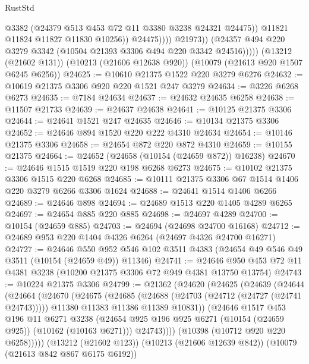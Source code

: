 \begin{lexlean}{RustStd}
\begin{coremodule}
                            @3382
                            (@24379 @513 @453 @72 @11 @3380 @3238 @24321 @24475))
                          @11821
                          @11824
                          @11827
                          @11830
                          @10256))
                      @24475))))
              @21973))
          (@24357 @494 @220 @3279 @3342 (@10504 @21393 @3306 @494 @220 @3342 @24516)))))
    (@13212 (@21602 @131))
    (@10213 (@21606 @12638 @920))
    (@10079 (@21613 @920 @1507 @6245 @6256))
@24625 := @10610 @21375 @1522 @220 @3279 @6276
@24632 := @10619 @21375 @3306 @920 @220 @1521 @247 @3279
@24634 := @3226 @6268 @6273
@24635 := @7184 @24634
@24637 := @24632 @24635 @6258
@24638 := @11507 @21733
@24639 := @24637 @24638
@24641 := @10125 @21375 @3306
@24644 := @24641 @1521 @247 @24635
@24646 := @10134 @21375 @3306
@24652 := @24646 @894 @1520 @220 @222 @4310 @24634
@24654 := @10146 @21375 @3306
@24658 := @24654 @872 @220 @872 @4310
@24659 := @10155 @21375
@24664 := @24652 (@24658 (@10154 (@24659 @872)) @16238)
@24670 := @24646 @1515 @1519 @220 @198 @6268 @6273
@24675 := @10102 @21375 @3306 @1515 @220 @6268
@24685 := @10111 @21375 @3306 @67 @1514 @1406 @220 @3279 @6266 @3306 @1624
@24688 := @24641 @1514 @1406 @6266
@24689 := @24646 @898
@24694 := @24689 @1513 @220 @1405 @4289 @6265
@24697 := @24654 @885 @220 @885
@24698 := @24697 @4289
@24700 := @10154 (@24659 @885)
@24703 := @24694 (@24698 @24700 @16168)
@24712 := @24689 @953 @220 @1404 @4326 @6264 (@24697 @4326 @24700 @16271)
@24727 := @24646
    @550
    @952
    @546
    @102
    @3511
    @4383
    (@24654 @49 @546 @49 @3511 (@10154 (@24659 @49)) @11346)
@24741 := @24646 @950 @453 @72 @11 @4381 @3238 (@10200 @21375 @3306 @72 @949 @4381 @13750 @13754)
@24743 := @10224 @21375 @3306
@24799 := @21362
    (@24620
      (@24625
        (@24639
          (@24644
            (@24664
              (@24670
                (@24675
                  (@24685
                    (@24688 (@24703 (@24712 (@24727 (@24741 @24743)))))
                    @11380
                    @11383
                    @11386
                    @11389
                    @10831))
                (@24646
                  @1517
                  @453
                  @196
                  @11
                  @6271
                  @3238
                  (@24654 @925 @196 @925 @6271 (@10154 (@24659 @925)) (@10162 (@10163 @6271)))
                  @24743))))
          (@10398 (@10712 @920 @220 @6258)))))
    (@13212 (@21602 @123))
    (@10213 (@21606 @12639 @842))
    (@10079 (@21613 @842 @867 @6175 @6192))

\end{coremodule}
\end{lexlean}
